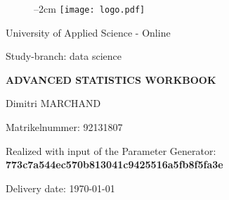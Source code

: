 
\label{titlePage}
\begin{figure}[h]
\centering
\advance\leftskip--2cm
\texttt{[image: logo.pdf]}
\end{figure}
\FloatBarrier


\vspace*{5mm}

\begin{large} 
\begin{center}
University of Applied Science - Online
\end{center}
\end{large} 

\begin{large} 
\begin{center}
Study-branch: data science
\end{center}
\end{large}

\vspace*{15mm}

\begin{Large} 
\begin{center}
\textbf{ADVANCED STATISTICS WORKBOOK}
\end{center}
\end{Large}

\vspace*{15mm}

\begin{large} 
\begin{center}
Dimitri MARCHAND
\end{center}
\end{large} 

\vspace*{-6mm}

\begin{large} 
\begin{center}
Matrikelnummer: 92131807
\end{center}
\end{large} 





\begin{large} 
\begin{center}
Realized with input of the Parameter Generator: \textbf{773c7a544ec570b813041c9425516a5fb8f5fa3e}
\end{center}
\end{large} 



\vspace*{-6mm}

\begin{large} 
\begin{center}
Delivery date: \today
\end{center}
\end{large} 


\pagestyle{empty} %

